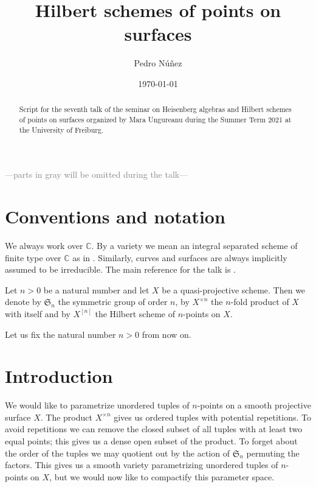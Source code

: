 \documentclass[12pt,a4paper]{amsart}
\title[Hilbert schemes of points on surfaces]{Hilbert schemes of points on surfaces}
\author[Pedro N\'{u}\~{n}ez]{Pedro N\'{u}\~{n}ez}
\date{\today}
\theoremstyle{plain}
\theoremstyle{definition}
\theoremstyle{remark}
\begin{document}
\maketitle

\begin{abstract}
  Script for the seventh talk of the seminar on Heisenberg algebras and Hilbert schemes of points on surfaces organized by Mara Ungureanu during the Summer Term 2021 at the University of Freiburg.
\end{abstract}

\tableofcontents

\begin{center}
  \textcolor{gray}{---parts in gray will be omitted during the talk---}
\end{center}

\setcounter{section}{-1}

\section{Conventions and notation}

We always work over $\mathbb{C}$.
By a variety we mean an integral separated scheme of finite type over $\mathbb{C}$ as in \cite{har77}.
Similarly, curves and surfaces are always implicitly assumed to be irreducible.
The main reference for the talk is \cite[\S 1]{nak99}.

Let $n > 0$ be a natural number and let $X$ be a quasi-projective scheme.
Then we denote by $\mathfrak{S}_{n}$ the symmetric group of order $n$, by $X^{\times n}$ the $n$-fold product of $X$ with itself and by $X^{[n]}$ the Hilbert scheme of $n$-points on $X$.

Let us fix the natural number $n > 0$ from now on.

\section{Introduction}

We would like to parametrize unordered tuples of $n$-points on a smooth projective surface $X$.
The product $X^{\times n}$ gives us ordered tuples with potential repetitions.
To avoid repetitions we can remove the closed subset of all tuples with at least two equal points; this gives us a dense open subset of the product.
To forget about the order of the tuples we may quotient out by the action of $\mathfrak{S}_{n}$ permuting the factors.
This gives us a smooth variety parametrizing unordered tuples of $n$-points on $X$, but we would now like to compactify this parameter space.
\end{document}
